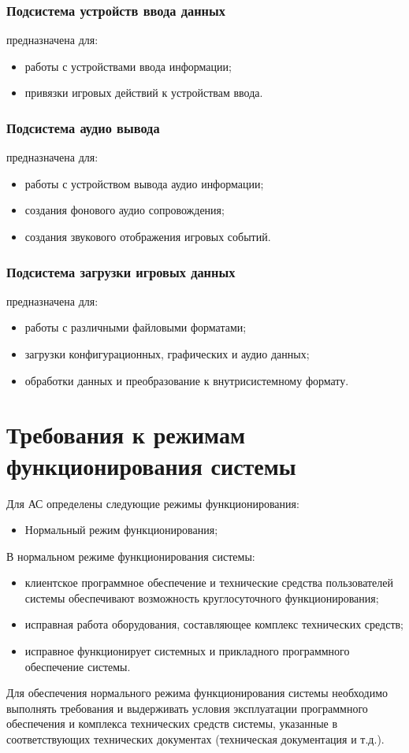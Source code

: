\subsubsection{Подсистема устройств ввода данных}
предназначена для:
\begin{itemize}
    \item работы с устройствами ввода информации;
    \item привязки игровых действий к устройствам ввода.
\end{itemize}

\subsubsection{Подсистема аудио вывода}
предназначена для:
\begin{itemize}
    \item работы с устройством вывода аудио информации;
    \item создания фонового аудио сопровождения;
    \item создания звукового отображения игровых событий.
\end{itemize}

\subsubsection{Подсистема загрузки игровых данных}
предназначена для:
\begin{itemize}
    \item работы с различными файловыми форматами;
    \item загрузки конфигурационных, графических и аудио данных;
    \item обработки данных и преобразование к внутрисистемному формату.
\end{itemize}

\section{Требования к режимам функционирования системы}
Для АС определены следующие режимы функционирования:
\begin{itemize}
    \item Нормальный режим функционирования;
\end{itemize}
В нормальном режиме функционирования системы:
\begin{itemize}
    \item клиентское программное обеспечение и технические средства пользователей системы 
        обеспечивают возможность круглосуточного функционирования;
    \item исправная работа оборудования, составляющее комплекс технических средств;
    \item исправное функционирует системных и прикладного программного обеспечение системы.
\end{itemize}
Для обеспечения нормального режима функционирования системы необходимо выполнять требования и 
выдерживать условия эксплуатации программного обеспечения и комплекса технических средств системы, 
указанные в соответствующих технических документах (техническая документация и т.д.).

